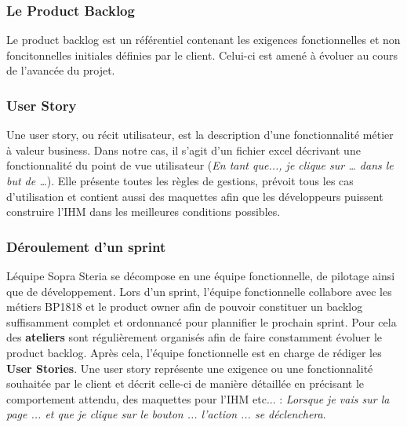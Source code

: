 	\subsubsection{Le Product Backlog}
	Le product backlog est un référentiel contenant les exigences fonctionnelles et non foncitonnelles initiales définies par le client. Celui-ci est amené à évoluer au cours de l'avancée du projet.
	
	\subsubsection{User Story}
	Une user story, ou récit utilisateur, est la description d'une fonctionnalité métier à valeur business. Dans notre cas, il s'agit d'un fichier excel décrivant une fonctionnalité du point de vue utilisateur (\textit{En tant que..., je clique sur … dans le but de …}). Elle présente toutes les règles de gestions, prévoit tous les cas d'utilisation et contient aussi des maquettes afin que les développeurs puissent construire l'IHM dans les meilleures conditions possibles.
	
	\subsubsection{Déroulement d'un sprint}
	Léquipe Sopra Steria se décompose en une équipe fonctionnelle, de pilotage ainsi que de développement. Lors d'un sprint, l'équipe fonctionnelle collabore avec les métiers BP1818 et le product owner afin de pouvoir constituer un backlog suffisamment complet et ordonnancé pour plannifier le prochain sprint. Pour cela des \textbf{ateliers} sont régulièrement organisés afin de faire constamment évoluer le product backlog. Après cela, l'équipe fonctionnelle est en charge de rédiger les \textbf{User Stories}. Une user story représente une exigence ou une fonctionnalité souhaitée par le client et décrit celle-ci de manière détaillée en précisant le comportement attendu, des maquettes pour l'IHM etc... : \textit{Lorsque je vais sur la page ... et que je clique sur le bouton ... l'action ... se déclenchera}. \\
	
